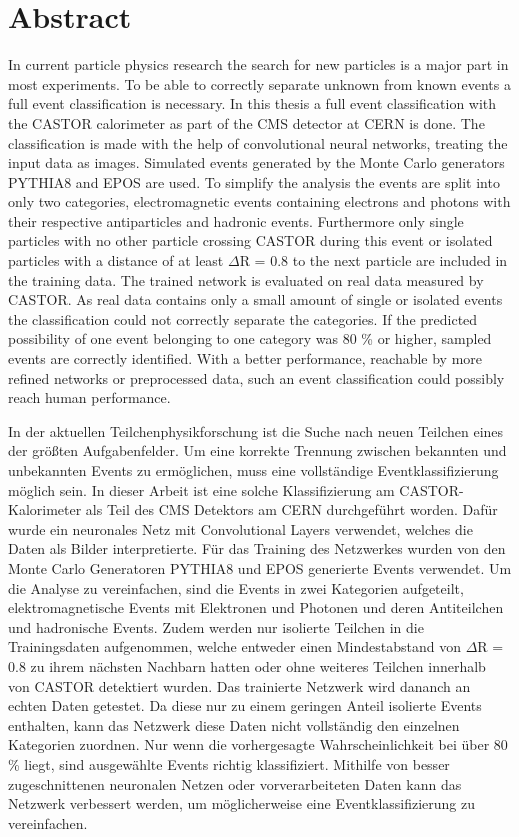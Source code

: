 \section*{Abstract}

In current particle physics research the search for new particles is a major part in most experiments. To be able to correctly separate unknown from known events a full event classification is necessary. In this thesis a full event classification with the CASTOR calorimeter as part of the CMS detector at CERN is done. The classification is made with the help of convolutional neural networks, treating the input data as images. Simulated events generated by the Monte Carlo generators PYTHIA8 and EPOS are used. To simplify the analysis the events are split into only two categories, electromagnetic events containing electrons and photons with their respective antiparticles and hadronic events. Furthermore only single particles with no other particle crossing CASTOR during this event or isolated particles with a distance of at least $\Delta$R = 0.8 to the next particle are included in the training data. The trained network is evaluated on real data measured by CASTOR. As real data contains only a small amount of single or isolated events the classification could not correctly separate the categories. If the predicted possibility of one event belonging to one category was 80 \% or higher, sampled events are correctly identified. With a better performance, reachable by more refined networks or preprocessed data, such an event classification could possibly reach human performance.  

\vspace{2cm}

In der aktuellen Teilchenphysikforschung ist die Suche nach neuen Teilchen eines der größten Aufgabenfelder. Um eine korrekte Trennung zwischen bekannten und unbekannten Events zu ermöglichen, muss eine vollständige Eventklassifizierung möglich sein. In dieser Arbeit ist eine solche Klassifizierung am CASTOR-Kalorimeter als Teil des CMS Detektors am CERN durchgeführt worden. Dafür wurde ein neuronales Netz mit Convolutional Layers verwendet, welches die Daten als Bilder interpretierte. Für das Training des Netzwerkes wurden von den Monte Carlo Generatoren PYTHIA8 und EPOS generierte Events verwendet. Um die Analyse zu vereinfachen, sind die Events in zwei Kategorien aufgeteilt, elektromagnetische Events mit Elektronen und Photonen und deren Antiteilchen und hadronische Events. Zudem werden nur isolierte Teilchen in die Trainingsdaten aufgenommen, welche entweder einen Mindestabstand von $\Delta$R = 0.8 zu ihrem nächsten Nachbarn hatten oder ohne weiteres Teilchen innerhalb von CASTOR detektiert wurden. Das trainierte Netzwerk wird dananch an echten Daten getestet. Da diese nur zu einem geringen Anteil isolierte Events enthalten, kann das Netzwerk diese Daten nicht vollständig den einzelnen Kategorien zuordnen. Nur wenn die vorhergesagte Wahrscheinlichkeit bei über 80 \% liegt, sind ausgewählte Events richtig klassifiziert. Mithilfe von besser zugeschnittenen neuronalen Netzen oder vorverarbeiteten Daten kann das Netzwerk verbessert werden, um möglicherweise eine Eventklassifizierung zu vereinfachen.
\cleardoublepage